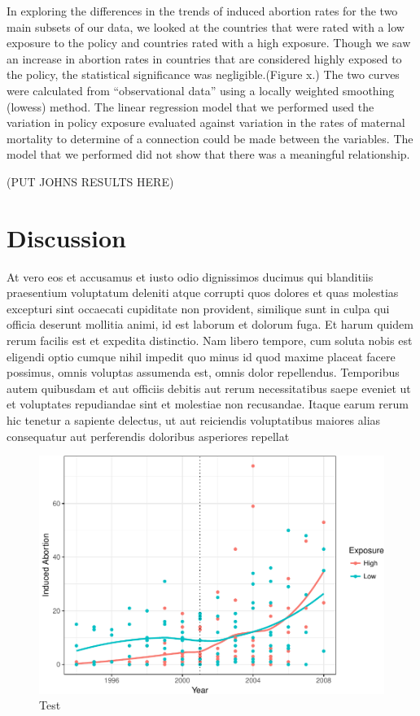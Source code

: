 \documentclass[11pt,]{article}
\makeatletter
\def\maxwidth{\ifdim\Gin@nat@width>\linewidth\linewidth
\else\Gin@nat@width\fi}
\let\Oldincludegraphics\includegraphics
\renewcommand{\includegraphics}[1]{\Oldincludegraphics[width=\maxwidth]{#1}}
\makeatother
\begin{document}
In exploring the differences in the trends of induced abortion rates for
the two main subsets of our data, we looked at the countries that were
rated with a low exposure to the policy and countries rated with a high
exposure. Though we saw an increase in abortion rates in countries that
are considered highly exposed to the policy, the statistical
significance was negligible.(Figure x.) The two curves were calculated
from ``observational data'' using a locally weighted smoothing (lowess)
method. The linear regression model that we performed used the variation
in policy exposure evaluated against variation in the rates of maternal
mortality to determine of a connection could be made between the
variables. The model that we performed did not show that there was a
meaningful relationship.

(PUT JOHNS RESULTS HERE)

\section{Discussion}\label{discussion}

At vero eos et accusamus et iusto odio dignissimos ducimus qui
blanditiis praesentium voluptatum deleniti atque corrupti quos dolores
et quas molestias excepturi sint occaecati cupiditate non provident,
similique sunt in culpa qui officia deserunt mollitia animi, id est
laborum et dolorum fuga. Et harum quidem rerum facilis est et expedita
distinctio. Nam libero tempore, cum soluta nobis est eligendi optio
cumque nihil impedit quo minus id quod maxime placeat facere possimus,
omnis voluptas assumenda est, omnis dolor repellendus. Temporibus autem
quibusdam et aut officiis debitis aut rerum necessitatibus saepe eveniet
ut et voluptates repudiandae sint et molestiae non recusandae. Itaque
earum rerum hic tenetur a sapiente delectus, ut aut reiciendis
voluptatibus maiores alias consequatur aut perferendis doloribus
asperiores repellat

\begin{figure}
\centering
\includegraphics{final-paper_files/figure-latex/unnamed-chunk-1-1.pdf}
\caption{Test}
\end{figure}
\end{document}
